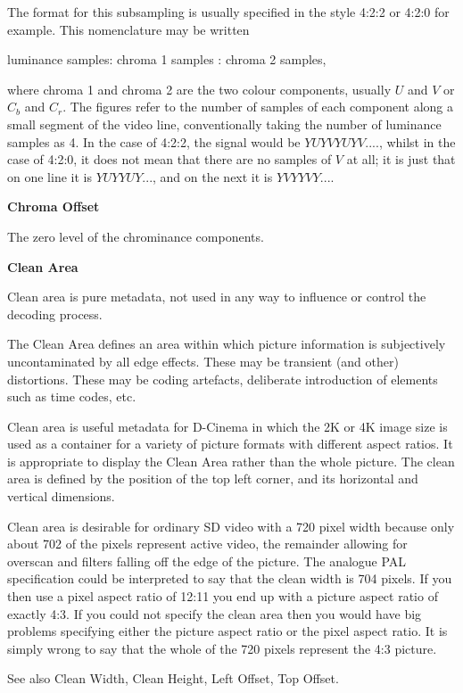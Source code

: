 The format for this subsampling is usually specified in the style 4:2:2
or 4:2:0 for example. This nomenclature may be written

luminance samples: chroma 1 samples : chroma 2 samples,

where chroma 1 and chroma 2 are the two colour components, usually $U$
and $V$ or $C_b$ and $C_r$. The figures refer to the number of samples
of each component along a small segment of the video line,
conventionally taking the number of luminance samples as 4. In the case
of 4:2:2, the signal would be $Y U Y V Y U Y V ...$., whilst in the case
of 4:2:0, it does not mean that there are no samples of $V$ at all; it
is just that on one line it is $YUYYUY ...$, and on the next it is
$YVYYVY ...$.

\textbf{Chroma Offset}

The zero level of the chrominance components.

\textbf{Clean Area}

Clean area is pure metadata, not used in any way to influence or control
the decoding process.

The Clean Area defines an area within which picture information is
subjectively uncontaminated by all edge effects. These may be transient
(and other) distortions. These may be coding artefacts, deliberate
introduction of elements such as time codes, etc.

Clean area is useful metadata for D-Cinema in which the 2K or 4K image
size is used as a container for a variety of picture formats with
different aspect ratios.  It is appropriate to display the Clean Area
rather than the whole picture.  The clean area is defined by the
position of the top left corner, and its horizontal and vertical
dimensions.

Clean area is desirable for ordinary SD video with a 720 pixel width
because only about 702 of the pixels represent active video, the
remainder allowing for overscan and filters falling off the edge of the
picture. The analogue PAL specification could be interpreted to say that
the clean width is 704 pixels. If you then use a pixel aspect ratio of
12:11 you end up with a picture aspect ratio of exactly 4:3. If you
could not specify the clean area then you would have big problems
specifying either the picture aspect ratio or the pixel aspect ratio. It
is simply wrong to say that the whole of the 720 pixels represent the
4:3 picture.

See also Clean Width, Clean Height, Left Offset, Top Offset.

